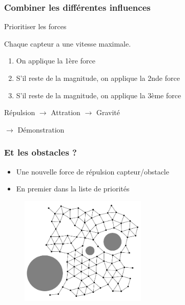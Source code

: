 \documentclass{beamer}
\begin{document}
\begin{frame}

  \frametitle{Combiner les différentes influences}

  \begin{block}{Prioritiser les forces}

    Chaque capteur a une vitesse maximale.

    \begin{enumerate}
      \item{On applique la 1ère force}
      \item{S'il reste de la magnitude, on applique la 2nde force}
      \item{S'il reste de la magnitude, on applique la 3ème force}
    \end{enumerate}

  \end{block}

  \vfill

  \begin{center}
    \alert{Répulsion $\rightarrow$ Attration $\rightarrow$ Gravité}
  \end{center}

  \vfill

  $\rightarrow$ Démonstration

\end{frame}

\begin{frame}

  \frametitle{Et les obstacles ?}

  \begin{itemize}
    \item{Une nouvelle force de répulsion capteur/obstacle}
    \item{En premier dans la liste de priorités}
  \end{itemize}

  \vfill

  \begin{figure}
    \centering
    \includegraphics[width=6cm]{obstacles.png}
  \end{figure}

\end{frame}
\end{document}
